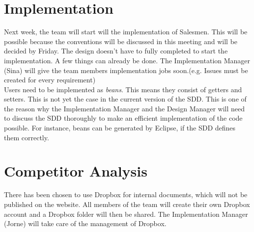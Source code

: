 \documentclass[a4paper, 12pt]{article}
\begin{document}
	\section{Implementation}
Next week, the team will start will the implementation of Salesmen. This will be possible because the conventions will be discussed in this meeting and will be decided by Friday. The design doesn't have to fully completed to start the implementation. A few things can already be done. The Implementation Manager (Sina) will give the team members implementation jobs soon.(e.g. Issues must be created for every requirement)\\
Users need to be implemented as \textit{beans}. This means they consist of getters and setters. This is not yet the case in the current version of the SDD. This is one of the reason why the Implementation Manager and the Design Manager will need to discuss the SDD thoroughly to make an efficient implementation of the code possible. For instance, beans can be generated by Eclipse, if the SDD defines them correctly.
		
	\section{Competitor Analysis}
There has been chosen to use Dropbox for internal documents, which will not be published on the website. All members of the team will create their own Dropbox account and a Dropbox folder will then be shared. The Implementation Manager (Jorne) will take care of the management of Dropbox.
	
\end{document}
